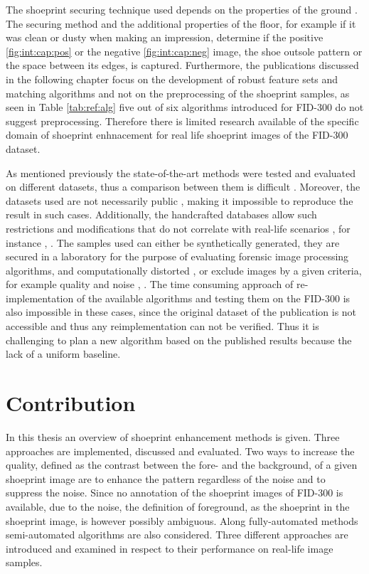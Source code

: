 \documentclass[draft,final]{vutinfth} %
\begin{document}
The shoeprint securing technique used depends on the properties of the ground  \cite{katireddy2017novel}. 
The securing method and the additional properties of the floor, for example if it was clean or dusty when making an impression, determine if the positive \ref{fig:int:cap:pos} or the negative \ref{fig:int:cap:neg} image, the shoe outsole pattern or the space between its edges, is captured.
Furthermore, the publications discussed in the following chapter focus on the development of robust feature sets and matching algorithms and not on the preprocessing of the shoeprint samples, as seen in Table \ref{tab:ref:alg} five out of six algorithms introduced for FID-300 do not suggest preprocessing.
Therefore there  is limited research available of the specific domain of shoeprint enhnacement for real life shoeprint images of the FID-300 dataset.
\par
As mentioned previously the state-of-the-art methods were tested and evaluated on different datasets, thus a comparison between them is difficult \cite{rida2019forensic}.
Moreover, the datasets used are not necessarily public \cite{katireddy2017novel}, \cite{dardi2009texture} making it impossible to reproduce the result in such cases.
Additionally, the handcrafted databases allow such restrictions and modifications that do not correlate with real-life scenarios \cite{rida2019forensic}, for instance \cite{dardi2009texture}, \cite{tang2010footwear}.
The samples used can either be synthetically generated, they are secured in a laboratory for the purpose of evaluating forensic image processing algorithms, and computationally distorted \cite{de2005automated}, \cite{gueham2008automatic} or exclude images by a given criteria, for example quality and noise \cite{dardi2009texture}, \cite{tang2010footwear}.
The time consuming approach of re-implementation of the available algorithms and testing them on the FID-300 is also impossible in these cases, since the original dataset of the publication is not accessible and thus any reimplementation can not be verified.
Thus it is challenging to plan a new algorithm based on the published results because the lack of a uniform baseline.

\section{Contribution}
\par
In this thesis an overview of shoeprint enhancement methods is given.
Three approaches are implemented, discussed and evaluated.
Two ways to increase the quality, defined as the contrast between the fore- and the background, of a given shoeprint image are to enhance the pattern regardless of the noise and to suppress the noise.
Since no annotation of the shoeprint images of FID-300 is available, due to the noise, the definition of foreground, as the shoeprint in the shoeprint image, is however possibly ambiguous.
Along fully-automated methods semi-automated algorithms are also considered.
Three different approaches are introduced and examined in respect to their performance on real-life image samples.
\end{document}
